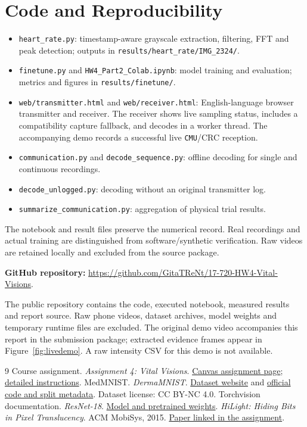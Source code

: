 \documentclass[10pt,a4paper,twoside]{article}
\begin{document}
\section{Code and Reproducibility}
\begin{itemize}
\item \texttt{heart\_rate.py}: timestamp-aware grayscale extraction, filtering, FFT and peak detection; outputs in \texttt{results/heart\_rate/IMG\_2324/}.
\item \texttt{finetune.py} and \texttt{HW4\_Part2\_Colab.ipynb}: model training and evaluation; metrics and figures in \texttt{results/finetune/}.
\item \texttt{web/transmitter.html} and \texttt{web/receiver.html}: English-language browser transmitter and receiver. The receiver shows live sampling status, includes a compatibility capture fallback, and decodes in a worker thread. The accompanying demo records a successful live \texttt{CMU}/CRC reception.
\item \texttt{communication.py} and \texttt{decode\_sequence.py}: offline decoding for single and continuous recordings.
\item \texttt{decode\_unlogged.py}: decoding without an original transmitter log.
\item \texttt{summarize\_communication.py}: aggregation of physical trial results.
\end{itemize}
The notebook and result files preserve the numerical record. Real recordings and actual training are distinguished from software/synthetic verification. Raw videos are retained locally and excluded from the source package.

\noindent\textbf{GitHub repository:} \url{https://github.com/GitaTReNt/17-720-HW4-Vital-Visions}.

The public repository contains the code, executed notebook, measured results and report source. Raw phone videos, dataset archives, model weights and temporary runtime files are excluded. The original demo video accompanies this report in the submission package; extracted evidence frames appear in Figure~\ref{fig:livedemo}. A raw intensity CSV for this demo is not available.

\begin{thebibliography}{9}
 Course assignment. \emph{Assignment 4: Vital Visions}. \href{https://canvas.cmu.edu/courses/55703/assignments/1008627}{Canvas assignment page}; \href{https://healthsensing.notion.site/Assignment-4-Vital-Visions-e931b19764b848c8ab0ef525d2081d93}{detailed instructions}.
 MedMNIST. \emph{DermaMNIST}. \href{https://medmnist.com/}{Dataset website} and \href{https://github.com/MedMNIST/MedMNIST}{official code and split metadata}. Dataset license: CC BY-NC 4.0.
 Torchvision documentation. \emph{ResNet-18}. \href{https://docs.pytorch.org/vision/stable/models/generated/torchvision.models.resnet18.html}{Model and pretrained weights}.
 \emph{HiLight: Hiding Bits in Pixel Translucency}. ACM MobiSys, 2015. \href{https://cs.columbia.edu/~xia/publication/mobisys15-hilight/mobisys15-hilight.pdf}{Paper linked in the assignment}.
\end{thebibliography}
\end{document}
